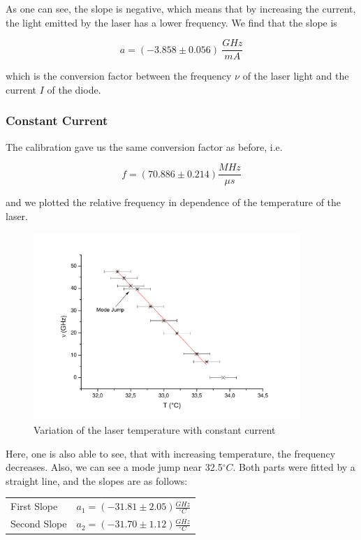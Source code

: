 As one can see, the slope is negative, which means that by increasing the current, the light emitted by the laser has a lower frequency. We find that the slope is

$$ a = (-3.858 \pm 0.056)\ \frac{GHz}{mA}$$

which is the conversion factor between the frequency $\nu$ of the laser light and the current $I$ of the diode.

\subsubsection{Constant Current}

The calibration gave us the same conversion factor as before, i.e.

$$f = (70.886 \pm  0.214) \frac{MHz}{\mu s} $$

and we plotted the relative frequency in dependence of the temperature of the laser.

\begin{figure}[H]
\centering \includegraphics[width=0.9\textwidth]{BilderAusw/I_fest.pdf}
\caption{Variation of the laser temperature with constant current}
\end{figure}

Here, one is also able to see, that with increasing temperature, the frequency decreases. Also, we can see a mode jump near 32.5$^\circ C$. Both parts were fitted by a straight line, and the slopes are as follows:

\begin{center}
\begin{tabular}[H]{l l}
First Slope & $a_1 = (-31.81 \pm 2.05) \frac{GHz}{^\circ C}$\\
Second Slope & $a_2 = (-31.70 \pm 1.12) \frac{GHz}{^\circ C}$\\
\end{tabular}
\end{center}

